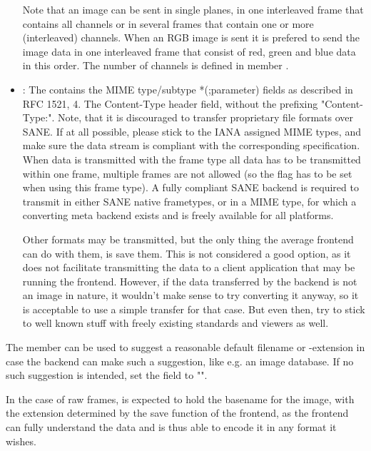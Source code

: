 \documentclass[11pt,DVIps]{report}
\begin{document}
\begin{changebar}
\begin{itemize}
Note that an image can be sent in single planes, in one interleaved
frame that contains all channels or in several frames that contain
one or more (interleaved) channels. When an RGB image is sent it
is prefered to send the image data in one interleaved frame
that consist of red, green and blue data in this order.
The number of channels is defined in member .

\item
{}: 
The  contains the MIME type/subtype *(;parameter) 
fields as described in RFC 1521, 4. The Content-Type header field, 
without the prefixing "Content-Type:". 
Note, that it is discouraged to transfer proprietary file formats over 
SANE. If at all possible, please stick to the IANA assigned MIME types, 
and make sure the data stream is compliant with the corresponding 
specification. 
When data is transmitted with the frame type 
all data has to be transmitted within one frame, multiple frames
are not allowed (so the flag  has to be set
when using this frame type).
A fully compliant SANE backend is required to transmit in either 
SANE native frametypes, or in a MIME type, for which a converting 
meta backend exists and is freely available for all platforms. 

Other formats may be transmitted, but the only thing the average 
frontend can do with them, is save them. This is not considered a 
good option, as it does not facilitate transmitting the data to a 
client application that may be running the frontend. 
However, if the data transferred by the backend is not an image in 
nature, it wouldn't make sense to try converting it anyway, so it is 
acceptable to use a simple  transfer for that 
case. But even then, try to stick to well known stuff with freely 
existing standards and viewers as well. 
\end{itemize}

The member  can be used to suggest a reasonable 
default filename or -extension in case the backend can make such a 
suggestion, like e.g. an image database. 
If no such suggestion is intended, set the field to "". 

In the case of raw frames,  is expected to hold
the basename for the image, with the extension determined by the save function
of the frontend, as the frontend can fully understand the data and is thus
able to encode it in any format it wishes.


\end{changebar}
\end{document}
